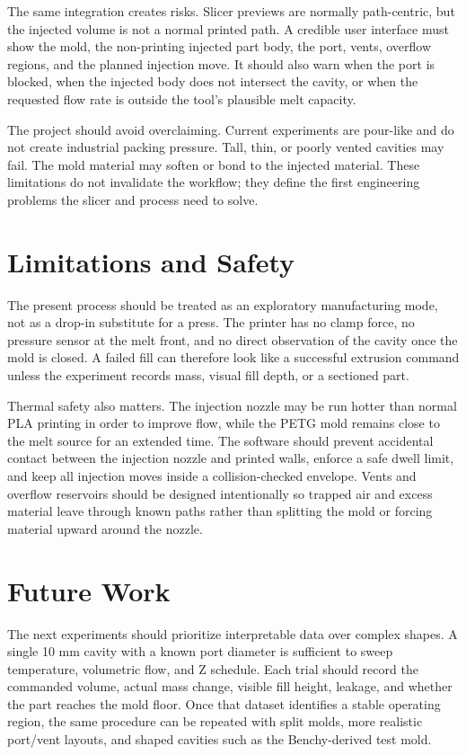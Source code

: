 \documentclass[conference]{IEEEtran}
\begin{document}
The same integration creates risks. Slicer previews are normally path-centric, but the injected volume is not a normal printed path. A credible user interface must show the mold, the non-printing injected part body, the port, vents, overflow regions, and the planned injection move. It should also warn when the port is blocked, when the injected body does not intersect the cavity, or when the requested flow rate is outside the tool's plausible melt capacity.

The project should avoid overclaiming. Current experiments are pour-like and do not create industrial packing pressure. Tall, thin, or poorly vented cavities may fail. The mold material may soften or bond to the injected material. These limitations do not invalidate the workflow; they define the first engineering problems the slicer and process need to solve.

\section{Limitations and Safety}
The present process should be treated as an exploratory manufacturing mode, not as a drop-in substitute for a press. The printer has no clamp force, no pressure sensor at the melt front, and no direct observation of the cavity once the mold is closed. A failed fill can therefore look like a successful extrusion command unless the experiment records mass, visual fill depth, or a sectioned part.

Thermal safety also matters. The injection nozzle may be run hotter than normal PLA printing in order to improve flow, while the PETG mold remains close to the melt source for an extended time. The software should prevent accidental contact between the injection nozzle and printed walls, enforce a safe dwell limit, and keep all injection moves inside a collision-checked envelope. Vents and overflow reservoirs should be designed intentionally so trapped air and excess material leave through known paths rather than splitting the mold or forcing material upward around the nozzle.

\section{Future Work}
The next experiments should prioritize interpretable data over complex shapes. A single 10 mm cavity with a known port diameter is sufficient to sweep temperature, volumetric flow, and Z schedule. Each trial should record the commanded volume, actual mass change, visible fill height, leakage, and whether the part reaches the mold floor. Once that dataset identifies a stable operating region, the same procedure can be repeated with split molds, more realistic port/vent layouts, and shaped cavities such as the Benchy-derived test mold.
\end{document}
